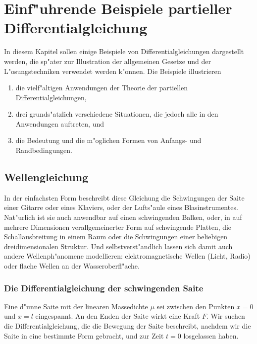 %
%
%
\chapter{Einf"uhrende Beispiele partieller Differentialgleichung\label{chapter-beispiele}}
In diesem Kapitel sollen einige Beispiele von Differentialgleichungen
dargestellt werden, die sp"ater zur Illustration der allgemeinen
Gesetze und der L"osungstechniken verwendet werden k"onnen.
Die Beispiele illustrieren
\begin{enumerate}
\item die vielf"altigen Anwendungen der Theorie der partiellen 
Differentialgleichungen,
\item drei grunds"atzlich verschiedene
Situationen, die jedoch alle in den Anwendungen auftreten, und
\item die Bedeutung und die m"oglichen Formen von Anfangs-
und Randbedingungen.
\end{enumerate}

\section{Wellengleichung\label{beispiele:wellengleichung}}
In der einfachsten Form beschreibt diese Gleichung die Schwingungen der
Saite einer Gitarre oder eines Klaviers, oder der Lufts"aule eines
Blasinstrumentes.
Nat"urlich ist sie auch anwendbar auf einen schwingenden
Balken, oder, in auf mehrere Dimensionen verallgemeinerter Form auf
schwingende Platten, die Schallausbreitung in einem Raum oder die Schwingungen
einer beliebigen dreidimensionalen Struktur.
Und selbstverst"andlich
lassen sich damit auch andere Wellen\-ph"a\-no\-mene modellieren:
elektromagnetische Wellen (Licht, Radio) oder flache Wellen an der
Wasseroberfl"ache.

\subsection{Die Differentialgleichung der schwingenden Saite\label{beispiele:schingende-saite}}
Eine d"unne Saite mit der linearen Massedichte $\mu$ sei zwischen den
Punkten $x=0$ und $x=l$ eingespannt. An den Enden der Saite wirkt eine
Kraft $F$. Wir suchen die Differentialgleichung, die die Bewegung der Saite
beschreibt, nachdem wir die Saite in eine bestimmte Form gebracht, und
zur Zeit $t=0$ losgelassen haben.

